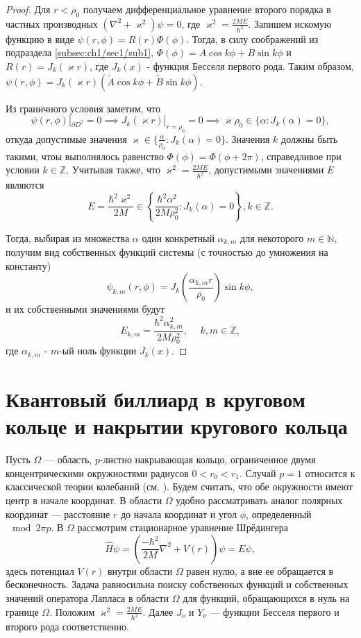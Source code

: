 \begin{proof}
Для $r < \rho_0$ получаем дифференциальное уравнение второго порядка в частных производных $(\nabla^2 + \varkappa^2)\psi = 0$, где $\varkappa^2 = \frac{2M E}{\hbar^2}$. Запишем искомую функцию в виде $\psi(r, \phi) = R(r)\Phi(\phi)$. Тогда, в силу соображений из подраздела \ref{subsec:ch1/sec1/sub1}, $\Phi(\phi) = A\cos{k\phi} + B\sin{k\phi}$ и $R(r) = J_k(\varkappa r)$, где $J_k(x)$ - функция Бесселя первого рода. Таким образом, $\psi(r, \phi) = J_k(\varkappa r) (\widetilde{A}\cos{k\phi} + \widetilde{B}\sin{k\phi} )$.

Из граничного условия заметим, что $$\psi(r, \phi) |_{\partial D^2} = 0 \implies J_k(\varkappa r)|_{r=\rho_0} = 0 \implies \varkappa \rho_0 \in \{\alpha: J_k(\alpha) = 0\},$$
откуда допустимые значения $\varkappa \in \{ \frac{\alpha}{\rho_0} : J_k(\alpha)=0 \}$. Значения $k$ должны быть такими, чтоы выполнялось равенство $\Phi(\phi) = \Phi(\phi+2\pi)$, справедливое при условии $k \in \mathbb{Z}$. Учитывая также, что $\varkappa^2 = \frac{2M E}{\hbar^2}$, допустимыми значениями $E$ являются
$$E = \frac{\hbar^2\varkappa^2}{2M} \in \left\{ \frac{\hbar^2\alpha^2}{2M\rho_0^2}: J_k(\alpha)=0 \right\}, k \in \mathbb{Z}.$$

Тогда, выбирая из множества $\alpha$ один конкретный $\alpha_{k, m}$ для некоторого $m \in \mathbb{N}$, получим вид собственных функций системы (с точностью до умножения на константу) 
$$\psi_{k, m}(r, \phi) = J_k\left(\frac{\alpha_{k, m}r}{\rho_0}\right) \sin{k\phi},$$
и их собственными значениями будут
$$E_{k, m} = \frac{\hbar^2\alpha_{k, m}^2}{2M\rho_0^2}, \hspace{15pt} k, m \in \mathbb{Z},$$
где $\alpha_{k, m}$ - $m$-ый ноль функции $J_k(x)$.
\end{proof}

\section{Квантовый биллиард в круговом кольце и накрытии кругового кольца}\label{sec:ch1/sec3}
Пусть  $\Omega$ --- область, $p$-листно накрывающая кольцо, 
ограниченное двумя концентрическими окружностями радиусов $0 < r_0 < r_1$. Случай $p=1$ относится к классической теории колебаний (см. \cite{wref11}). Будем считать, что обе окружности имеют центр в начале координат.
В  области $\Omega$ удобно рассматривать аналог полярных координат --- расстояние $r$ до начала координат и угол $\phi$, определенный  $\mod 2\pi p$. 
В $\Omega$ рассмотрим стационарное уравнение Шрёдингера
$$\hat{H}\psi = \left(\frac{-\hbar^2}{2M} \nabla^2  + V(r)\right)\psi = E\psi,$$здесь потенциал $V(r)$ внутри области $\Omega$ равен нулю, а вне ее обращается в бесконечность. Задача равносильна поиску собственных функций и собственных значений оператора Лапласа в области $\Omega$ для функций, обращающихся в нуль на границе $\Omega$.
Положим  $\varkappa^2 = \frac{2 M E}{\hbar^2}$. Далее $J_\nu$  и $Y_\nu$ --- функции Бесселя первого и  второго рода соответственно.

